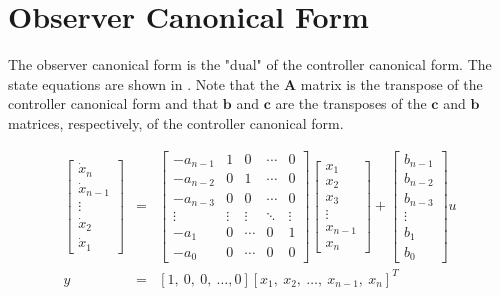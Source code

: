 \section*{Observer Canonical Form}
The observer canonical form is the "dual" of the controller
canonical form. The state equations are shown in
. Note that the $\mathbf{A}$ matrix is the
transpose of the controller canonical form and that $\mathbf{b}$
and $\mathbf{c}$ are the transposes of the $\mathbf{c}$ and
$\mathbf{b}$ matrices, respectively, of the controller canonical
form.
\begin{slide} \label{slide:l5s9} 
\begin{eqnarray*} \left[\begin{array}{c}
  \dot{x}_{n} \\
  \dot{x}_{n-1} \\
  \vdots \\
  \dot{x}_{2} \\
  \dot{x}_{1}
\end{array}\right] &=& \left[\begin{array}{ccccc}
 -a_{n-1} & 1 & 0 & \cdots & 0 \\
 -a_{n-2} & 0 & 1 & \cdots & 0 \\
 -a_{n-3} & 0 & 0 & \cdots & 0 \\
  \vdots & \vdots & \vdots & \ddots & \vdots \\
 -a_{1} & 0 & \cdots & 0 & 1 \\
 -a_{0} & 0 & \cdots & 0 & 0
\end{array}\right]\left[\begin{array}{c}
  {x}_{1} \\
  {x}_{2} \\
  {x}_{3} \\
  \vdots \\
  {x}_{n-1} \\
  {x}_{n}
\end{array}\right]+\left[\begin{array}{c}
  b_{n-1} \\
  b_{n-2} \\
  b_{n-3} \\
  \vdots \\
  b_{1} \\
  b_0
\end{array}\right]u\\ y & = & [1,\ 0,\ 0,\ \ldots, 0]\left[
  {x}_{1},\
  {x}_{2},\
  \ldots,\
  {x}_{n-1},\
  {x}_{n}
\right]^T
\end{eqnarray*}
\end{slide}
